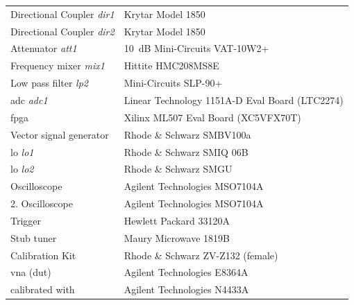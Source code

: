 \documentclass[12pt,a4paper,parskip=full,abstract=true,BCOR=12mm,twoside,open=right]{scrreprt}
\def\device#1{\textit{#1}}
\begin{document}
\begin{longtable}{ll}
    Directional Coupler \device{dir1} & Krytar Model 1850\\
    Directional Coupler \device{dir2} & Krytar Model 1850\\
    Attenuator \device{att1}          & \SI{10}{\deci\bel} Mini-Circuits VAT-10W2+\\
    Frequency mixer \device{mix1}     & Hittite HMC208MS8E \\
    Low pass filter \device{lp2}      & Mini-Circuits SLP-90+\\
    \gls{adc} \device{adc1}           & Linear Technology 1151A-D Eval Board (LTC2274) \\
    \gls{fpga}                        & Xilinx ML507 Eval Board (XC5VFX70T) \\
    Vector signal generator           & Rhode \& Schwarz SMBV100a \\
    \gls{lo} \device{lo1}             & Rhode \& Schwarz SMIQ 06B \\
    \gls{lo} \device{lo2}             & Rhode \& Schwarz SMGU \\
    Oscilloscope                      & Agilent Technologies MSO7104A \\
    2. Oscilloscope                   & Agilent Technologies MSO7104A \\
    Trigger                           & Hewlett Packard 33120A \\
    Stub tuner                        & Maury Microwave 1819B \\
    Calibration Kit                   & Rhode \& Schwarz ZV-Z132 (female) \\
    \gls{vna} (\gls{dut})             & Agilent Technologies E8364A\\
    \hspace{2em} calibrated with      & Agilent Technologies N4433A\\
\end{longtable}
\end{document}
